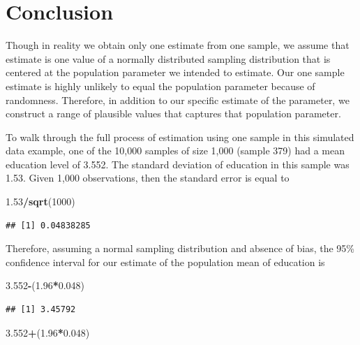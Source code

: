 \documentclass[
]{book}
\newenvironment{Shaded}{\begin{snugshade}}{\end{snugshade}}
\newcommand{\DecValTok}[1]{\textcolor[rgb]{0.00,0.00,0.81}{#1}}
\newcommand{\FloatTok}[1]{\textcolor[rgb]{0.00,0.00,0.81}{#1}}
\newcommand{\KeywordTok}[1]{\textcolor[rgb]{0.13,0.29,0.53}{\textbf{#1}}}
\newcommand{\NormalTok}[1]{#1}
\newcommand{\OperatorTok}[1]{\textcolor[rgb]{0.81,0.36,0.00}{\textbf{#1}}}
\begin{document}
\hypertarget{conclusion}{%
\section{Conclusion}\label{conclusion}}

Though in reality we obtain only one estimate from one sample, we assume that estimate is one value of a normally distributed sampling distribution that is centered at the population parameter we intended to estimate. Our one sample estimate is highly unlikely to equal the population parameter because of randomness. Therefore, in addition to our specific estimate of the parameter, we construct a range of plausible values that captures that population parameter.

To walk through the full process of estimation using one sample in this simulated data example, one of the 10,000 samples of size 1,000 (sample 379) had a mean education level of 3.552. The standard deviation of education in this sample was 1.53. Given 1,000 observations, then the standard error is equal to

\begin{Shaded}
\begin{Highlighting}[]
\FloatTok{1.53}\OperatorTok{/}\KeywordTok{sqrt}\NormalTok{(}\DecValTok{1000}\NormalTok{)}
\end{Highlighting}
\end{Shaded}

\begin{verbatim}
## [1] 0.04838285
\end{verbatim}

Therefore, assuming a normal sampling distribution and absence of bias, the 95\% confidence interval for our estimate of the population mean of education is

\begin{Shaded}
\begin{Highlighting}[]
\FloatTok{3.552}\OperatorTok{-}\NormalTok{(}\FloatTok{1.96}\OperatorTok{*}\FloatTok{0.048}\NormalTok{)}
\end{Highlighting}
\end{Shaded}

\begin{verbatim}
## [1] 3.45792
\end{verbatim}

\begin{Shaded}
\begin{Highlighting}[]
\FloatTok{3.552}\OperatorTok{+}\NormalTok{(}\FloatTok{1.96}\OperatorTok{*}\FloatTok{0.048}\NormalTok{)}
\end{Highlighting}
\end{Shaded}
\end{document}
